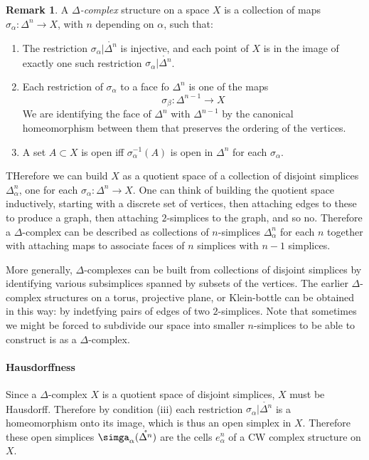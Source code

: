 \documentclass[11pt,a4paper]{article}
\theoremstyle{definition}
\newtheorem{remark}[definition]{Remark}
\theoremstyle{plain}
\theoremstyle{remark}
\begin{document}
\begin{remark}
A \emph{$\Delta$-complex} structure on a space $X$ is a collection of maps $\sigma_\alpha \colon \Delta^n \to X$, 
with $n$ depending on $\alpha$, such that: 
\begin{enumerate}[label = (\roman*)]
  \item The restriction $\sigma_\alpha | \mathring{\Delta^n}$ is injective, and each 
  point of $X$ is in the image of exactly one such restriction $\sigma_\alpha | \mathring{\Delta^n}$.

  \item Each restriction of $\sigma_\alpha$ to a face fo $\Delta^n$ is one of the maps 
  $$\sigma_\beta \colon \Delta^{n-1} \to X$$
  We are identifying the face of $\Delta^n$ with $\Delta^{n-1}$ by the canonical homeomorphism between 
  them that preserves the ordering of the vertices. 

  \item A set $A \subset X$ is open iff $\sigma_\alpha^{-1} (A)$ is open in $\Delta^n$ 
  for each $\sigma_\alpha$.
\end{enumerate}

THerefore we can build $X$ as a quotient space of a collection of disjoint simplices 
$\Delta^n_\alpha$, one for each $\sigma_\alpha \colon \Delta^n \to X$. One can think of 
building the quotient space inductively, starting with a discrete set of vertices, then 
attaching edges to these to produce a graph, then attaching $2$-simplices to the graph, and 
so no. Therefore a $\Delta$-complex can be described as collections of $n$-simplices $\Delta_\alpha^n$
for each $n$ together with attaching maps to associate faces of $n$ simplices with $n-1$ simplices. 

More generally, $\Delta$-complexes can be built from collections of disjoint simplices by identifying 
various subsimplices spanned by subsets of the vertices. 
The earlier $\Delta$-complex structures on a torus, projective plane, or Klein-bottle can be obtained 
in this way: by indetfying pairs of edges of two $2$-simplices. 
Note that sometimes we might be forced to subdivide our space into smaller $n$-simplices to be able to 
construct is as a $\Delta$-complex. 

\paragraph{Hausdorffness} Since a $\Delta$-complex $X$ is a quotient space of disjoint simplices, $X$ 
must be Hausdorff. Therefore by condition (iii) each restriction $\sigma_\alpha | \mathring{\Delta^n}$ 
is a homeomorphism onto its image, which is thus an open simplex in $X$. Therefore 
these open simplices $\simga_\alpha (\mathring{\Delta^n})$ are the cells $e_\alpha^n$ of a CW 
complex structure on $X$.


\end{remark}
\end{document}
